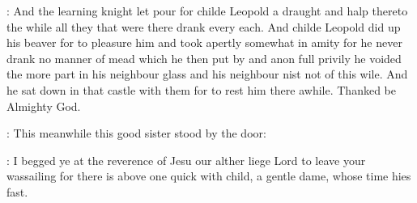\documentclass[12pt]{article}
\begin{document}



: And the learning knight let pour for childe Leopold a draught and halp
thereto the while all they that were there drank every each. And childe
Leopold did up his beaver for to pleasure him and took apertly somewhat in
amity for he never drank no manner of mead which he then put by and
anon full privily he voided the more part in his neighbour glass and his
neighbour nist not of this wile. And he sat down in that castle with them
for to rest him there awhile. Thanked be Almighty God.




: This meanwhile this good sister stood by the door:

\nc: I begged ye at the reverence of Jesu our alther liege Lord
to leave your wassailing for there is above one quick with child,
a gentle dame, whose time hies fast.
\end{document}
